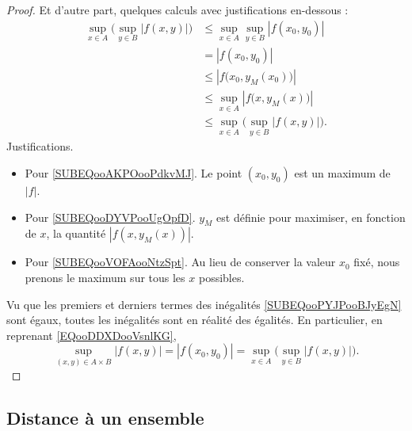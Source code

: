 \begin{proof}
	Et d'autre part, quelques calculs avec justifications en-dessous :
	\begin{subequations}        \label{SUBEQooPYJPooBJyEgN}
		\begin{align}
			\sup_{x\in A}\big( \sup_{y\in B}| f(x,y) | \big) & \leq \sup_{x\in A}\sup_{y\in B}| f(x_0,y_0) |  \label{SUBEQooAKPOooPdkvMJ} \\
			                                                 & =| f(x_0,y_0) |                                                            \\
			                                                 & \leq | f\big(x_0,y_M(x_0)\big) |       \label{SUBEQooDYVPooUgOpfD}         \\
			                                                 & \leq \sup_{x\in A}| f\big(x,y_M(x)\big) |  \label{SUBEQooVOFAooNtzSpt}     \\
			                                                 & \leq \sup_{x\in A}\big( \sup_{y\in B}| f(x,y) | \big).
		\end{align}
	\end{subequations}
	Justifications.
	\begin{itemize}
		\item   Pour \eqref{SUBEQooAKPOooPdkvMJ}. Le point \( (x_0,y_0)\) est un maximum de \( | f |\).
		\item Pour \eqref{SUBEQooDYVPooUgOpfD}. \( y_M\) est définie pour maximiser, en fonction de \( x\), la quantité \( | f(x, y_M(x)) |\).
		\item Pour \eqref{SUBEQooVOFAooNtzSpt}. Au lieu de conserver la valeur \( x_0\) fixé, nous prenons le maximum sur tous les \( x\) possibles.
	\end{itemize}
	Vu que les premiers et derniers termes des inégalités \eqref{SUBEQooPYJPooBJyEgN} sont égaux, toutes les inégalités sont en réalité des égalités. En particulier, en reprenant \eqref{EQooDDXDooVsnlKG},
	\begin{equation}
		\sup_{(x,y)\in A\times B}| f(x,y) |=| f(x_0,y_0) |=\sup_{x\in A}\big( \sup_{y\in B}| f(x,y) | \big).
	\end{equation}
\end{proof}

\subsection{Distance à un ensemble}

